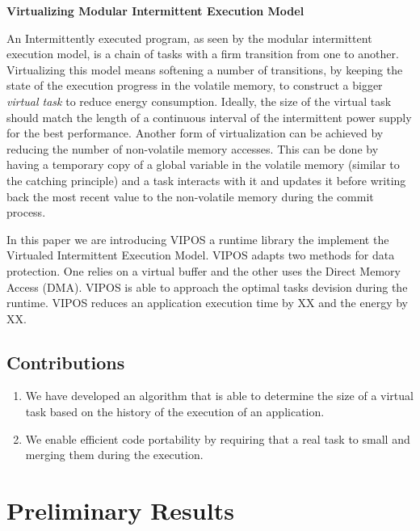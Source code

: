 \documentclass[sigconf,anonymous,review]{acmart}
\begin{document}
\noindent\textbf{Virtualizing Modular Intermittent Execution Model}

		An Intermittently executed program, as seen by the modular intermittent execution model, is a chain of tasks with a firm transition from one to another. 
		Virtualizing this model means softening a number of transitions, by keeping the state of the execution progress in the volatile memory, to construct a bigger \emph{virtual task} to reduce energy consumption. Ideally, the size of the virtual task should match the length of a continuous interval of the intermittent power supply for the best performance. Another form of virtualization can be achieved by reducing the number of non-volatile memory accesses. This can be done by having a temporary copy of a global variable in the volatile memory (similar to the catching principle) and a task interacts with it and updates it before writing back the most recent value to the non-volatile memory during the commit process.

		In this paper we are introducing VIPOS a runtime library the implement the Virtualed Intermittent Execution Model. VIPOS adapts two methods for data protection. One relies on a virtual buffer and the other uses the Direct Memory Access (DMA). VIPOS is able to approach the optimal tasks devision during the runtime. VIPOS reduces an application execution time by XX and the energy by XX. 


\subsection{Contributions}
	 \begin{enumerate}
		 \item We have developed an algorithm that is able to determine the size of a virtual task based on the history of the execution of an application. 
		 \item We enable efficient code portability by requiring that a real task to small and merging them during the execution.   
	\end{enumerate}


 \section{Preliminary Results}
 \label{sec:prelResults}
\end{document}
